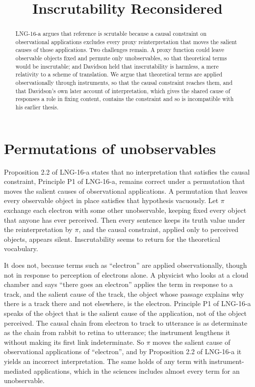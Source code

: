 \documentclass{situationist-preprint}
\title{Inscrutability Reconsidered}
\begin{document}
\maketitle

\begin{abstract}
LNG-16-a argues that reference is scrutable because a causal constraint on observational applications excludes every proxy reinterpretation that moves the salient causes of those applications. Two challenges remain. A proxy function could leave observable objects fixed and permute only unobservables, so that theoretical terms would be inscrutable; and Davidson held that inscrutability is harmless, a mere relativity to a scheme of translation. We argue that theoretical terms are applied observationally through instruments, so that the causal constraint reaches them, and that Davidson's own later account of interpretation, which gives the shared cause of responses a role in fixing content, contains the constraint and so is incompatible with his earlier thesis.
\end{abstract}

\section{Permutations of unobservables}

Proposition 2.2 of LNG-16-a states that no interpretation that satisfies the causal constraint, Principle P1 of LNG-16-a, remains correct under a permutation that moves the salient causes of observational applications. A permutation that leaves every observable object in place satisfies that hypothesis vacuously. Let $\pi$ exchange each electron with some other unobservable, keeping fixed every object that anyone has ever perceived. Then every sentence keeps its truth value under the reinterpretation by $\pi$, and the causal constraint, applied only to perceived objects, appears silent. Inscrutability seems to return for the theoretical vocabulary.

It does not, because terms such as \enquote{electron} are applied observationally, though not in response to perception of electrons alone. A physicist who looks at a cloud chamber and says \enquote{there goes an electron} applies the term in response to a track, and the salient cause of the track, the object whose passage explains why there is a track there and not elsewhere, is the electron. Principle P1 of LNG-16-a speaks of the object that is the salient cause of the application, not of the object perceived. The causal chain from electron to track to utterance is as determinate as the chain from rabbit to retina to utterance; the instrument lengthens it without making its first link indeterminate. So $\pi$ moves the salient cause of observational applications of \enquote{electron}, and by Proposition 2.2 of LNG-16-a it yields an incorrect interpretation. The same holds of any term with instrument-mediated applications, which in the sciences includes almost every term for an unobservable.
\end{document}
